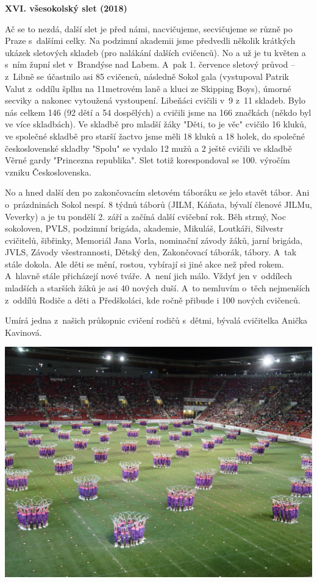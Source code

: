 \documentclass[a5paper, 11pt, twoside]{article}
\begin{document}
\textbf{XVI. všesokolský slet (2018)}

Ač se to nezdá, další slet je před námi, nacvičujeme, secvičujeme se
různě po Praze s~dalšími celky. Na podzimní akademii jsme předvedli
několik krátkých ukázek sletových skladeb (pro nalákání dalších
cvičenců). No a už je tu květen a s~ním župní slet v~Brandýse nad Labem.
A~pak 1. července sletový průvod -- z~Libně se účastnilo asi 85
cvičenců, následně Sokol gala (vystupoval Patrik Valut z~oddílu šplhu na
11metrovém laně a kluci ze Skipping Boys), úmorné secviky a nakonec
vytoužená vystoupení. Libeňáci cvičili v~9 z~11 skladeb. Bylo nás celkem
146 (92 dětí a 54 dospělých) a cvičili jsme na 166 značkách (někdo byl
ve více skladbách). Ve skladbě pro mladší žáky "Děti, to je věc"
cvičilo 16 kluků, ve společné skladbě pro starší žactvo jsme měli 18
kluků a 18 holek, do společné československé skladby "Spolu" se vydalo
12 mužů a 2 ještě cvičili ve skladbě Věrné gardy "Princezna
republika". Slet totiž korespondoval se 100. výročím vzniku
Československa.

No a hned další den po zakončovacím sletovém táboráku se jelo stavět
tábor. Ani o~prázdninách Sokol nespí. 8 týdnů táborů (JILM, Káňata,
bývalí členové JILMu, Veverky) a je tu pondělí 2. září a začíná další
cvičební rok. Běh strmý, Noc sokoloven, PVLS, podzimní brigáda,
akademie, Mikuláš, Loutkáři, Silvestr cvičitelů, šibřinky, Memoriál Jana
Vorla, nominační závody žáků, jarní brigáda, JVLS, Závody všestrannosti,
Dětský den, Zakončovací táborák, tábory. A~tak stále dokola. Ale děti se
mění, rostou, vybírají si jiné akce než před rokem. A~hlavně stále
přicházejí nové tváře. A~není jich málo. Vždyť jen v~oddílech mladších a
starších žáků je asi 40 nových duší. A~to nemluvím o~těch nejmenších
z~oddílů Rodiče a děti a Předškoláci, kde ročně přibude i 100 nových
cvičenců.

Umírá jedna z~našich průkopnic cvičení rodičů s~dětmi, bývalá cvičitelka
Anička Kavinová.

 \includegraphics[width=\textwidth]{img/64_siluety.JPG}
\end{document}
